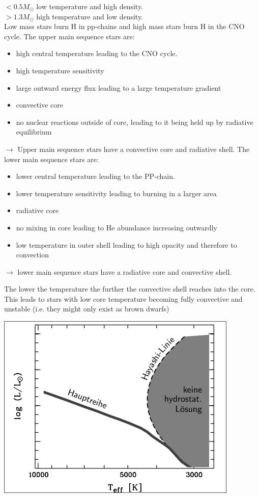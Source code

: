 \documentclass[11pt,a4paper]{article}
\begin{document}
$< 0.5 M_\odot$ low temperature and high density. \\
$> 1.3 M_\odot$ high temperature and low density. \\
Low mass stars burn H in pp-chains and high mass stars burn H in the CNO cycle.
The upper main sequence stars are: 
\begin{itemize}
    \item high central temperature leading to the CNO cycle.
    \item high temperature sensitivity
    \item large outward energy flux leading to a large temperature gradient 
    \item convective core 
    \item no nuclear reactions outside of core, leading to it being held up by radiative equilibrium 
\end{itemize}
$\rightarrow$ Upper main sequence stars have a convective core and radiative shell. 
The lower main sequence stars are: 
\begin{itemize}
    \item lower central temperature leading to the PP-chain.
    \item lower temperature sensitivity leading to burning in a larger area
    \item radiative core 
    \item no mixing in core leading to He abundance increasing outwardly
    \item low temperature in outer shell leading to high opacity and therefore to convection
\end{itemize}
$\rightarrow$ lower main sequence stars have a radiative core and convective shell. 

The lower the temperature the further the convective shell reaches into the core. 
This leads to stars with low core temperature becoming fully convective and unstable (i.e. they might only exist as brown dwarfs)
\begin{center}
    \includegraphics[width=0.5\linewidth]{screenshot_2024-01-23-122838.png}
\end{center}
\end{document}
